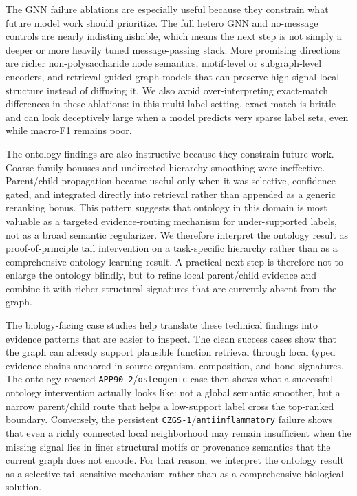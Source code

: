 \documentclass[11pt]{article}
\begin{document}
The GNN failure ablations are especially useful because they constrain what future model work should prioritize. The full hetero GNN and no-message controls are nearly indistinguishable, which means the next step is not simply a deeper or more heavily tuned message-passing stack. More promising directions are richer non-polysaccharide node semantics, motif-level or subgraph-level encoders, and retrieval-guided graph models that can preserve high-signal local structure instead of diffusing it. We also avoid over-interpreting exact-match differences in these ablations: in this multi-label setting, exact match is brittle and can look deceptively large when a model predicts very sparse label sets, even while macro-F1 remains poor.

The ontology findings are also instructive because they constrain future work. Coarse family bonuses and undirected hierarchy smoothing were ineffective. Parent/child propagation became useful only when it was selective, confidence-gated, and integrated directly into retrieval rather than appended as a generic reranking bonus. This pattern suggests that ontology in this domain is most valuable as a targeted evidence-routing mechanism for under-supported labels, not as a broad semantic regularizer. We therefore interpret the ontology result as proof-of-principle tail intervention on a task-specific hierarchy rather than as a comprehensive ontology-learning result. A practical next step is therefore not to enlarge the ontology blindly, but to refine local parent/child evidence and combine it with richer structural signatures that are currently absent from the graph.

The biology-facing case studies help translate these technical findings into evidence patterns that are easier to inspect. The clean success cases show that the graph can already support plausible function retrieval through local typed evidence chains anchored in source organism, composition, and bond signatures. The ontology-rescued \texttt{APP90-2}/\texttt{osteogenic} case then shows what a successful ontology intervention actually looks like: not a global semantic smoother, but a narrow parent/child route that helps a low-support label cross the top-ranked boundary. Conversely, the persistent \texttt{CZGS-1}/\texttt{antiinflammatory} failure shows that even a richly connected local neighborhood may remain insufficient when the missing signal lies in finer structural motifs or provenance semantics that the current graph does not encode. For that reason, we interpret the ontology result as a selective tail-sensitive mechanism rather than as a comprehensive biological solution.
\end{document}
